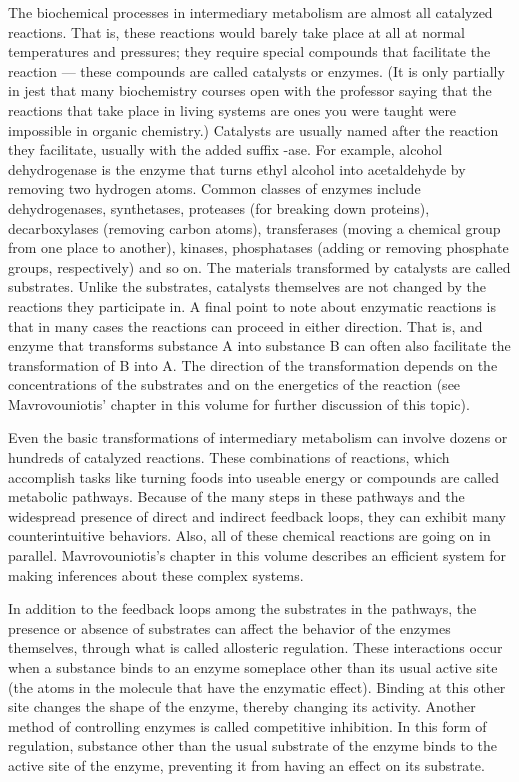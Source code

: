 The biochemical processes in intermediary metabolism are almost all catalyzed
reactions. That is, these reactions would barely take place at all at normal
temperatures and pressures; they require special compounds that facilitate the
reaction — these compounds are called catalysts or enzymes. (It is only
partially in jest that many biochemistry courses open with the professor saying
that the reactions that take place in living systems are ones you were taught
were impossible in organic chemistry.) Catalysts are usually named after the
reaction they facilitate, usually with the added suffix -ase. For example,
alcohol dehydrogenase is the enzyme that turns ethyl alcohol into acetaldehyde
by removing two hydrogen atoms. Common classes of enzymes include
dehydrogenases, synthetases, proteases (for breaking down proteins),
decarboxylases (removing carbon atoms), transferases (moving a chemical group
from one place to another), kinases, phosphatases (adding or removing phosphate
groups, respectively) and so on. The materials transformed by catalysts are
called substrates. Unlike the substrates, catalysts themselves are not changed
by the reactions they participate in. A final point to note about enzymatic
reactions is that in many cases the reactions can proceed in either direction.
That is, and enzyme that transforms substance A into substance B can often also
facilitate the transformation of B into A. The direction of the transformation
depends on the concentrations of the substrates and on the energetics of the
reaction (see Mavrovouniotis’ chapter in this volume for further discussion of
this topic).

Even the basic transformations of intermediary metabolism can involve dozens or
hundreds of catalyzed reactions. These combinations of reactions, which
accomplish tasks like turning foods into useable energy or compounds are called
metabolic pathways. Because of the many steps in these pathways and the
widespread presence of direct and indirect feedback loops, they can exhibit many
counterintuitive behaviors. Also, all of these chemical reactions are going on
in parallel. Mavrovouniotis’s chapter in this volume describes an efficient
system for making inferences about these complex systems.

In addition to the feedback loops among the substrates in the pathways, the
presence or absence of substrates can affect the behavior of the enzymes
themselves, through what is called allosteric regulation. These interactions
occur when a substance binds to an enzyme someplace other than its usual active
site (the atoms in the molecule that have the enzymatic effect). Binding at
this other site changes the shape of the enzyme, thereby changing its activity.
Another method of controlling enzymes is called competitive inhibition. In
this form of regulation, substance other than the usual substrate of the enzyme
binds to the active site of the enzyme, preventing it from having an effect on
its substrate.

